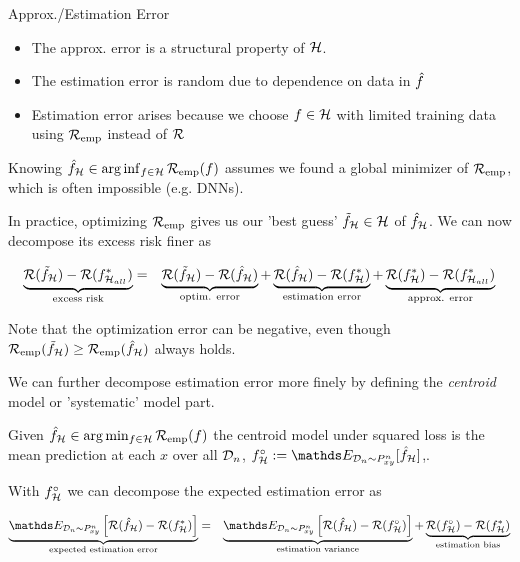 \documentclass[11pt,compress,t,notes=noshow, xcolor=table]{beamer}
\begin{document}
\begin{vbframe}{Approx./Estimation Error }
    
\begin{itemize}
    \item The approx. error is a structural property of $\mathcal{H}$.
    \item The estimation error is random due to dependence on data in $\hat{f}$
    \item Estimation error arises because we choose $f \in \mathcal{H}$ with limited training data using $\mathcal{R}_{\text{emp}}$ instead of $\mathcal{R}$
\end{itemize}

Knowing $\hat{f}_{\mathcal{H}} \in \arg\inf_{f \in \mathcal{H}} \mathcal{R}_{\text{emp}}(f)$ assumes we found a global minimizer of $\mathcal{R}_{\text{emp}}$, which is often impossible (e.g. DNNs). 
\vspace{0.2cm}

In practice, optimizing $\mathcal{R}_{\text{emp}}$ gives us our 'best guess' $\tilde{f}_{\mathcal{H}} \in \mathcal{H}$ of $\hat{f}_{\mathcal{H}}$. We can now decompose its excess risk finer as

\begin{eqnarray*}
    \underbrace{\mathcal{R}(\tilde{f}_{\mathcal{H}}) - \mathcal{R}(f^{\ast}_{\mathcal{H}_{all}})}_{\text{excess risk}} &=& \underbrace{\mathcal{R}(\tilde{f}_{\mathcal{H}}) - \mathcal{R}(\hat{f}_{\mathcal{H}})}_{\text{optim. error}} + \underbrace{\mathcal{R}(\hat{f}_{\mathcal{H}}) - \mathcal{R}(f^{\ast}_{\mathcal{H}})}_{\text{estimation error}} + \underbrace{\mathcal{R}(f^{\ast}_{\mathcal{H}}) -  \mathcal{R}(f^{\ast}_{\mathcal{H}_{all}})}_{\text{approx. error}} 
\end{eqnarray*}

Note that the optimization error can be negative, even though $\mathcal{R}_{\text{emp}}(\tilde{f}_{\mathcal{H}}) \geq \mathcal{R}_{\text{emp}}(\hat{f}_{\mathcal{H}})$ always holds.

\framebreak

We can further decompose estimation error more finely by defining the \textit{centroid} model or 'systematic' model part.\\
\vspace{0.15cm}

Given $\hat{f}_{\mathcal{H}} \in  \arg\min_{f \in \mathcal{H}} \mathcal{R}_{\text{emp}}(f)$ the centroid model under squared loss is the mean prediction at each $x$ over all $\mathcal{D}_n$, $f^{\circ}_{\Hspace} := \E_{\D_n \sim \Pxy^n}[\fh_{\Hspace}] $,.
\vspace{0.15cm}

With $f^{\circ}_{\mathcal{H}}$ we can decompose the expected estimation error as

\begin{eqnarray*}
 \underbrace{\E_{\D_n \sim \Pxy^n}\left[\risk(\hat{f}_{\Hspace}) - \risk(f ^{\ast}_{\Hspace})\right]}_{\text{expected estimation error}} &=& \underbrace{\E_{\D_n \sim \Pxy^n}\left[\risk(\hat{f}_{\Hspace}) - \risk(f^{\circ}_{\Hspace}) \right]}_{\text{estimation variance}} + \underbrace{\risk(f^{\circ}_{\Hspace})-\risk(f^{\ast}_{\Hspace})}_{\text{estimation bias}}   
\end{eqnarray*}


\end{vbframe}
\end{document}
